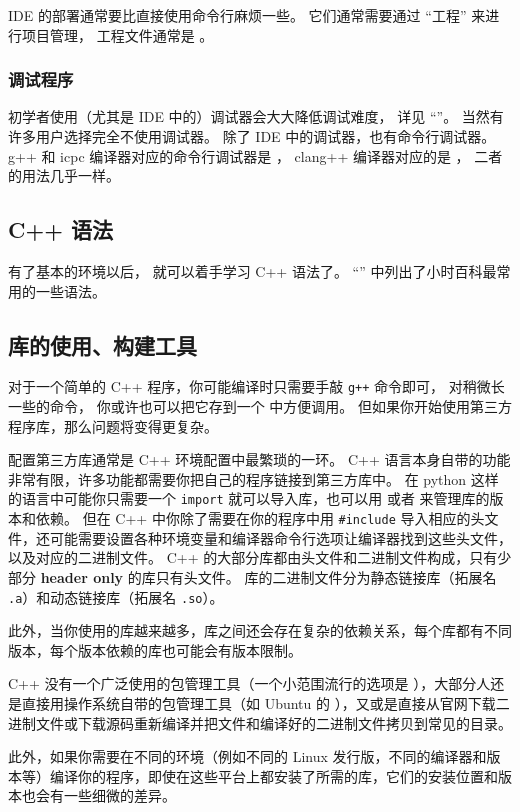 IDE 的部署通常要比直接使用命令行麻烦一些。 它们通常需要通过 “工程” 来进行项目管理， 工程文件通常是 。

\subsubsection{调试程序}
初学者使用（尤其是 IDE 中的）调试器会大大降低调试难度， 详见 “”。 当然有许多用户选择完全不使用调试器。 除了 IDE 中的调试器，也有命令行调试器。 g++ 和 icpc 编译器对应的命令行调试器是 ， clang++ 编译器对应的是 ， 二者的用法几乎一样。

\subsection{C++ 语法}
有了基本的环境以后， 就可以着手学习 C++ 语法了。 “” 中列出了小时百科最常用的一些语法。

\subsection{库的使用、构建工具}
对于一个简单的 C++ 程序，你可能编译时只需要手敲 \verb`g++` 命令即可， 对稍微长一些的命令， 你或许也可以把它存到一个 中方便调用。 但如果你开始使用第三方程序库，那么问题将变得更复杂。

配置第三方库通常是 C++ 环境配置中最繁琐的一环。 C++ 语言本身自带的功能非常有限，许多功能都需要你把自己的程序链接到第三方库中。 在 python 这样的语言中可能你只需要一个 \verb`import` 就可以导入库，也可以用  或者  来管理库的版本和依赖。 但在 C++ 中你除了需要在你的程序中用 \verb`#include` 导入相应的头文件，还可能需要设置各种环境变量和编译器命令行选项让编译器找到这些头文件，以及对应的二进制文件。 C++ 的大部分库都由头文件和二进制文件构成，只有少部分 \textbf{header only} 的库只有头文件。 库的二进制文件分为静态链接库（拓展名 \verb`.a`）和动态链接库（拓展名 \verb`.so`）。

此外，当你使用的库越来越多，库之间还会存在复杂的依赖关系，每个库都有不同版本，每个版本依赖的库也可能会有版本限制。

C++ 没有一个广泛使用的包管理工具（一个小范围流行的选项是 ），大部分人还是直接用操作系统自带的包管理工具（如 Ubuntu 的 ），又或是直接从官网下载二进制文件或下载源码重新编译并把文件和编译好的二进制文件拷贝到常见的目录。

此外，如果你需要在不同的环境（例如不同的 Linux 发行版，不同的编译器和版本等）编译你的程序，即使在这些平台上都安装了所需的库，它们的安装位置和版本也会有一些细微的差异。

